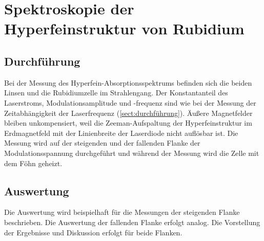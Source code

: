 \section{Spektroskopie der Hyperfeinstruktur von Rubidium}
\subsection{Durchführung}
Bei der Messung des Hyperfein-Absorptionsspektrums befinden sich die beiden Linsen und
die Rubidiumzelle im Strahlengang.
Der Konstantanteil des Laserstroms, Modulationsamplitude und -frequenz
sind wie bei der Messung der Zeitabhängigkeit der Laserfrequenz (\autoref{sect:durchführung}).
Äußere Magnetfelder bleiben unkompensiert, weil die Zeeman-Aufspaltung der Hyperfeinstruktur im Erdmagnetfeld
mit der Linienbreite der Laserdiode nicht auflösbar ist.
Die Messung wird auf der steigenden und der fallenden Flanke der Modulationsspannung durchgeführt und
während der Messung wird die Zelle mit dem Föhn geheizt.

\subsection{Auswertung}
Die Auswertung wird beispielhaft für die Messungen der steigenden Flanke beschrieben. Die Auswertung der fallenden Flanke erfolgt analog. 
Die Vorstellung der Ergebnisse und Diskussion erfolgt für beide Flanken.

